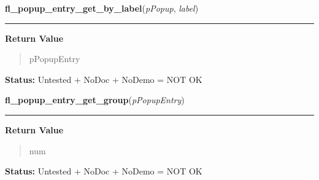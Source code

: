     \label{xformslib:library:fl_popup_entry_get_by_label}

    \vspace{0.5ex}

\hspace{.8\funcindent}\begin{boxedminipage}{\funcwidth}

    \raggedright \textbf{fl\_popup\_entry\_get\_by\_label}(\textit{pPopup}, \textit{label})

    \vspace{-1.5ex}

    \rule{\textwidth}{0.5\fboxrule}
\setlength{\parskip}{2ex}
\setlength{\parskip}{1ex}
      \textbf{Return Value}
    \vspace{-1ex}

      \begin{quote}
      pPopupEntry

      \end{quote}

\textbf{Status:} Untested + NoDoc + NoDemo = NOT OK



    \end{boxedminipage}

    \label{xformslib:library:fl_popup_entry_get_group}

    \vspace{0.5ex}

\hspace{.8\funcindent}\begin{boxedminipage}{\funcwidth}

    \raggedright \textbf{fl\_popup\_entry\_get\_group}(\textit{pPopupEntry})

    \vspace{-1.5ex}

    \rule{\textwidth}{0.5\fboxrule}
\setlength{\parskip}{2ex}
\setlength{\parskip}{1ex}
      \textbf{Return Value}
    \vspace{-1ex}

      \begin{quote}
      num

      \end{quote}

\textbf{Status:} Untested + NoDoc + NoDemo = NOT OK



    \end{boxedminipage}

